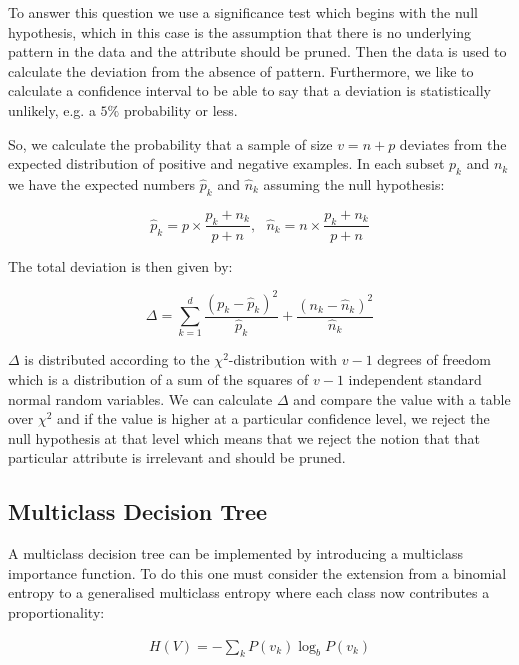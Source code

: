 \documentclass{article}
\begin{document}
To answer this question we use a significance test which begins with the null hypothesis, which in this case is the assumption that there is no underlying pattern in the data and the attribute should be pruned. Then the data is used to calculate the deviation from the absence of pattern. Furthermore, we like to calculate a confidence interval to be able to say that a deviation is statistically unlikely, e.g. a $5\%$ probability or less.

So, we calculate the probability that a sample of size $v=n+p$ deviates from the expected distribution of positive and negative examples. In each subset $p_k$ and $n_k$ we have the expected numbers $\hat{p}_k$ and $\hat{n}_k$ assuming the null hypothesis:

\begin{displaymath}
\hat{p}_k = p \times \frac{p_k+n_k}{p+n},\ \ \ \hat{n}_k = n \times \frac{p_k+n_k}{p+n}
\end{displaymath}

The total deviation is then given by:

\begin{displaymath}
\Delta = \sum_{k=1}^d\frac{(p_k-\hat{p}_k)^2}{\hat{p}_k} + \frac{(n_k-\hat{n}_k)^2}{\hat{n}_k}
\end{displaymath}

$\Delta$ is distributed according to the $\chi^2$-distribution with $v-1$ degrees of freedom which is a distribution of a sum of the squares of $v-1$ independent standard normal random variables. We can calculate $\Delta$ and compare the value with a table over $\chi^2$ and if the value is higher at a particular confidence level, we reject the null hypothesis at that level which means that we reject the notion that that particular attribute is irrelevant and should be pruned.


\subsection{Multiclass Decision Tree}

A multiclass decision tree can be implemented by introducing a multiclass importance function. To do this one must consider the extension from a binomial entropy to a generalised multiclass entropy where each class now contributes a proportionality:

\begin{align*}
    H(V) = -\sum_k P(v_k) \log_b P(v_k)
\end{align*}
\end{document}
